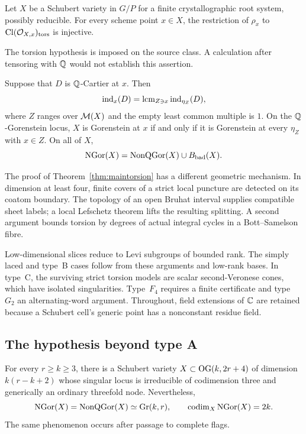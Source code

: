 \begin{theorem}\label{thm:maintorsion}
Let $X$ be a Schubert variety in $G/P$ for a finite crystallographic root system, possibly reducible. For every scheme point $x\in X$, the restriction of $\rho_x$ to $\operatorname{Cl}(\mathcal O_{X,x})_{\mathrm{tors}}$ is injective.
\end{theorem}

The torsion hypothesis is imposed on the source class. A calculation after tensoring with $\mathbb Q$ would not establish this assertion.

\begin{corollary}\label{cor:indices}
Suppose that $D$ is $\mathbb Q$-Cartier at $x$. Then
\[
 \operatorname{ind}_x(D)=\mathrm{lcm}_{Z\ni x}\operatorname{ind}_{\eta_Z}(D),
\]
where $Z$ ranges over $\mathcal M(X)$ and the empty least common multiple is $1$. On the $\mathbb Q$-Gorenstein locus, $X$ is Gorenstein at $x$ if and only if it is Gorenstein at every $\eta_Z$ with $x\in Z$. On all of $X$,
\[
 \operatorname{NGor}(X)=\operatorname{NonQGor}(X)\cup B_{\mathrm{bad}}(X).
\]
\end{corollary}

The proof of Theorem~\ref{thm:maintorsion} has a different geometric mechanism. In dimension at least four, finite covers of a strict local puncture are detected on its coatom boundary. The topology of an open Bruhat interval supplies compatible sheet labels; a local Lefschetz theorem lifts the resulting splitting. A second argument bounds torsion by degrees of actual integral cycles in a Bott--Samelson fibre.

Low-dimensional slices reduce to Levi subgroups of bounded rank. The simply laced and type~B cases follow from these arguments and low-rank bases. In type~C, the surviving strict torsion models are scalar second-Veronese cones, which have isolated singularities. Type~$F_4$ requires a finite certificate and type~$G_2$ an alternating-word argument. Throughout, field extensions of $\mathbb C$ are retained because a Schubert cell's generic point has a nonconstant residue field.

\subsection{The hypothesis beyond type A}
\begin{theorem}\label{thm:mainD}
For every $r\ge k\ge3$, there is a Schubert variety $X\subset\operatorname{OG}(k,2r+4)$ of dimension $k(r-k+2)$ whose singular locus is irreducible of codimension three and generically an ordinary threefold node. Nevertheless,
\[
 \operatorname{NGor}(X)=\operatorname{NonQGor}(X)\simeq\operatorname{Gr}(k,r),
 \qquad \operatorname{codim}_X\operatorname{NGor}(X)=2k.
\]
The same phenomenon occurs after passage to complete flags.
\end{theorem}

